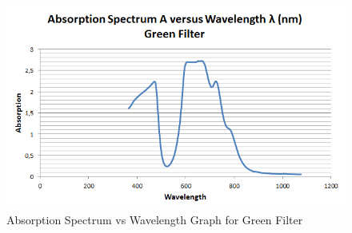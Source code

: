 \documentclass[a4paper,12pt]{report}
\begin{document}
\begin{figure}[h!]
\centering
\includegraphics[width=1.0\linewidth, height=0.4\textheight]{"Abs Green"}
\caption{Absorption Spectrum vs Wavelength Graph for Green Filter}
\label{fig:AbsGreen}
\end{figure}
\end{document}
